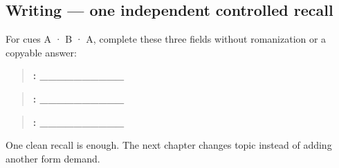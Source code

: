 \subsection*{Writing — one independent controlled recall}
For cues A · B · A, complete these three fields without romanization or a copyable answer:

\begin{quote}
\textbf{: \_\_\_\_\_\_\_\_\_\_}
\end{quote}

\begin{quote}
\textbf{: \_\_\_\_\_\_\_\_\_\_}
\end{quote}

\begin{quote}
\textbf{: \_\_\_\_\_\_\_\_\_\_}
\end{quote}

\begin{tcolorbox}[breakable,colback=teal!4,colframe=teal!35!black,title={Before you move on}]
One clean recall is enough. The next chapter changes topic instead of adding another form demand.
\end{tcolorbox}
